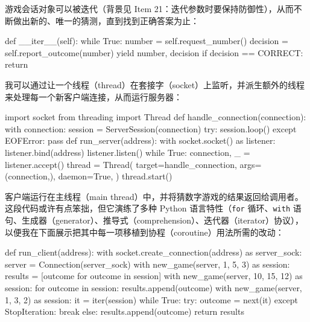游戏会话对象可以被迭代（背景见 Item 21：迭代参数时要保持防御性），从而不断做出新的、唯一的猜测，直到找到正确答案为止：

\begin{codebox}[python]
    def __iter__(self):
        while True:
            number = self.request_number()
            decision = self.report_outcome(number)
            yield number, decision
            if decision == CORRECT:
                return
\end{codebox}

我可以通过让一个线程（thread）在套接字（socket）上监听，并派生额外的线程来处理每一个新客户端连接，从而运行服务器：

\begin{codebox}[python]
import socket
from threading import Thread
def handle_connection(connection):
    with connection:
        session = ServerSession(connection)
        try:
            session.loop()
        except EOFError:
            pass
def run_server(address):
    with socket.socket() as listener:
        listener.bind(address)
        listener.listen()
        while True:
            connection, _ = listener.accept()
            thread = Thread(
                target=handle_connection,
                args=(connection,),
                daemon=True,
            )
            thread.start()
\end{codebox}

客户端运行在主线程（main thread）中，并将猜数字游戏的结果返回给调用者。这段代码或许有点笨拙，但它演练了多种 Python 语言特性（\texttt{for} 循环、\texttt{with} 语句、生成器（generator）、推导式（comprehension）、迭代器（iterator）协议），以便我在下面展示把其中每一项移植到协程（coroutine）用法所需的改动：

\begin{codebox}[python]
def run_client(address):
    with socket.create_connection(address) as server_sock:
        server = Connection(server_sock)
        with new_game(server, 1, 5, 3) as session:
            results = [outcome for outcome in session]
        with new_game(server, 10, 15, 12) as session:
            for outcome in session:
                results.append(outcome)
        with new_game(server, 1, 3, 2) as session:
            it = iter(session)
            while True:
                try:
                    outcome = next(it)
                except StopIteration:
                    break
                else:
                    results.append(outcome)
    return results
\end{codebox}

